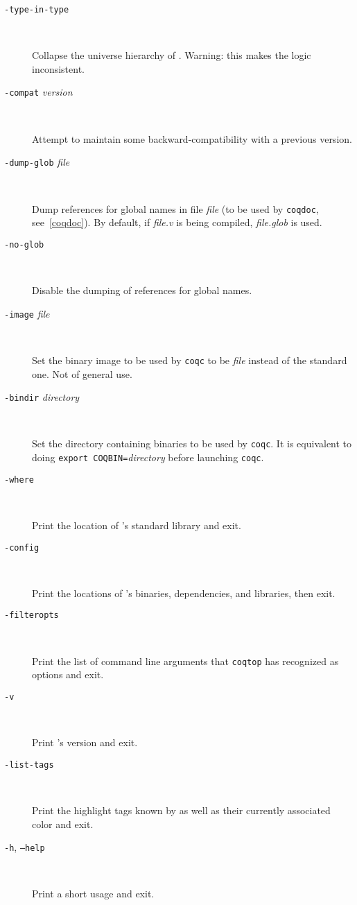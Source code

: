 \begin{description}
\item[{\tt -type-in-type}]\ %

  Collapse the universe hierarchy of {\Coq}. Warning: this makes the
  logic inconsistent.

\item[{\tt -compat} {\em version}]\ %

  Attempt to maintain some backward-compatibility with a previous version.

\item[{\tt -dump-glob} {\em file}]\ %

  Dump references for global names in file {\em file} (to be used
  by {\tt coqdoc}, see~\ref{coqdoc}). By default, if {\em file.v} is being
  compiled, {\em file.glob} is used.

\item[{\tt -no-glob}]\ %

  Disable the dumping of references for global names.


\item[{\tt -image} {\em file}]\ %

  Set the binary image to be used by {\tt coqc} to be {\em file}
  instead of the standard one. Not of general use.

\item[{\tt -bindir} {\em directory}]\ %

  Set the directory containing {\Coq} binaries to be used by {\tt coqc}.
  It is equivalent to doing \texttt{export COQBIN=}{\em directory} before
  launching {\tt coqc}.

\item[{\tt -where}]\ %

  Print the location of \Coq's standard library and exit.

\item[{\tt -config}]\ %

  Print the locations of \Coq's binaries, dependencies, and libraries, then exit.

\item[{\tt -filteropts}]\ %

  Print the list of command line arguments that {\tt coqtop} has
  recognized as options and exit.

\item[{\tt -v}]\ %

  Print \Coq's version and exit.

\item[{\tt -list-tags}]\ %

  Print the highlight tags known by {\Coq} as well as their currently associated
  color and exit.

\item[{\tt -h}, {\tt --help}]\ %

  Print a short usage and exit.

\end{description}


